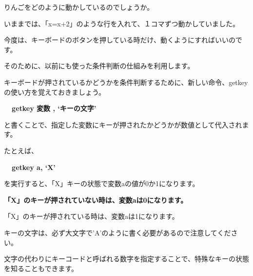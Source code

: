\documentclass[a4paper,12pt]{jarticle}
\begin{document}
\bigskip

りんごをどのように動かしているのでしょうか。

いままでは、「x=x+2」のような行を入れて、１コマずつ動かしていました。

今度は、キーボードのボタンを押している時だけ、動くようにすればいいのです。

そのために、以前にも使った条件判断の仕組みを利用します。


\bigskip

キーボードが押されているかどうかを条件判断するために、新しい命令、getkeyの使い方を覚えておきましょう。


\bigskip

{\bfseries
\ \ getkey 変数 , ‘キーの文字’}


\bigskip

と書くことで、指定した変数にキーが押されたかどうかが数値として代入されます。

たとえば、


\bigskip

{\bfseries
\ \ getkey a, ‘X’}


\bigskip

を実行すると、「X」キーの状態で変数aの値が0か1になります。

{\bfseries
「X」のキーが押されていない時は、変数aは0になります。

「X」のキーが押されている時は、変数aは1になります。}

\bigskip

キーの文字は、必ず大文字で’A’のように書く必要があるので注意してください。

文字の代わりにキーコードと呼ばれる数字を指定することで、特殊なキーの状態を知ることもできます。


\bigskip
\end{document}
